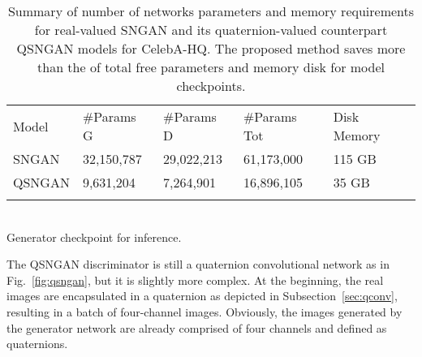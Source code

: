 \documentclass[graybox]{svmult}
\begin{document}
\begin{table}[t]
\centering
\caption{Summary of number of networks parameters and memory requirements for real-valued SNGAN and its quaternion-valued counterpart QSNGAN models for CelebA-HQ. The proposed method saves more than the  of total free parameters and memory disk for model checkpoints.}
\begin{tabular}{p{2cm}p{2.4cm}p{2.4cm}p{2.4cm}p{1.8cm}}
\hline\noalign{\smallskip}
 Model    & \#Params G & \#Params D & \#Params Tot & Disk Memory \\
\noalign{\smallskip}\svhline\noalign{\smallskip}
 SNGAN  & 32,150,787    & 29,022,213    & 61,173,000      &  115 GB \\
 QSNGAN & 9,631,204     & 7,264,901     & 16,896,105      &  35 GB  \\
\noalign{\smallskip}\hline\noalign{\smallskip}

\end{tabular}\\
\label{tab:params}
 Generator checkpoint for inference.
\end{table}

The QSNGAN discriminator is still a quaternion convolutional network as in Fig.~\ref{fig:qsngan}, but it is slightly more complex. At the beginning, the real images are encapsulated in a quaternion as depicted in Subsection~\ref{sec:qconv}, resulting in a batch of four-channel images. Obviously, the images generated by the generator network are already comprised of four channels and defined as quaternions.
\end{document}

